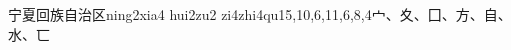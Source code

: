 \begin{EntryWithPhonetic}{宁夏回族自治区}{ning2xia4 hui2zu2 zi4zhi4qu1}{5,10,6,11,6,8,4}{⼧、⼢、⼞、⽅、⾃、⽔、⼖}
\end{EntryWithPhonetic}
